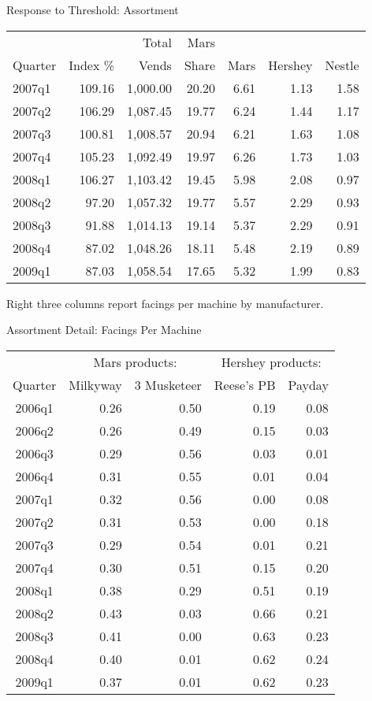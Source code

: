 \begin{frame}{Response to Threshold: Assortment}
\small
\begin{center}
\begin{tabular}{|l | rrr | rrr|} \toprule
 & & Total & Mars  & &  &  \\ 
Quarter &   Index \% & Vends & Share & Mars & Hershey & Nestle \\ \midrule
2007q1 & 109.16 & 1,000.00 & 20.20 & 6.61 & 1.13 & 1.58 \\
2007q2 & 106.29 & 1,087.45 & 19.77 & 6.24 & 1.44 & 1.17 \\
2007q3 & 100.81 & 1,008.57 & 20.94 & 6.21 & 1.63 & 1.08 \\
2007q4 & 105.23 & 1,092.49 & 19.97 & 6.26 & 1.73 & 1.03 \\ \midrule
2008q1 & 106.27 & 1,103.42 & 19.45 & 5.98 & 2.08 & 0.97 \\   \midrule
2008q2 & 97.20 & 1,057.32 & 19.77 & 5.57 & 2.29 & 0.93 \\ 
2008q3 & 91.88 & 1,014.13 & 19.14 & 5.37 & 2.29 & 0.91 \\
2008q4 & 87.02 & 1,048.26 & 18.11 & 5.48 & 2.19 & 0.89 \\
2009q1 & 87.03 & 1,058.54 & 17.65 & 5.32 & 1.99 & 0.83 \\ 
\bottomrule
\end{tabular}
\end{center}

Right three columns report facings per machine by manufacturer.
\end{frame}

\begin{frame}{Assortment Detail: Facings Per Machine}
\footnotesize
\begin{center}
\begin{tabular}{|c | r r r r|}\midrule
&\multicolumn{2}{c}{Mars products:}&\multicolumn{2}{c|}{Hershey products:}\\
Quarter &  Milkyway &  3 Musketeer & Reese's PB & Payday \\
\toprule
2006q1 & 0.26 & 0.50 & 0.19 & 0.08 \\
2006q2 & 0.26 & 0.49 & 0.15 & 0.03 \\
2006q3 & 0.29 & 0.56 & 0.03 & 0.01 \\
2006q4 & 0.31 & 0.55 & 0.01 & 0.04 \\
2007q1 & 0.32 & 0.56 & 0.00 & 0.08 \\
2007q2 & 0.31 & 0.53 & 0.00 & 0.18 \\
2007q3 & 0.29 & 0.54 & 0.01 & 0.21 \\
2007q4 & 0.30 & 0.51 & 0.15 & 0.20 \\ \midrule
2008q1 & 0.38 & 0.29 & 0.51 & 0.19 \\  \midrule
2008q2 & 0.43 & 0.03 & 0.66 & 0.21 \\ 
2008q3 & 0.41 & 0.00 & 0.63 & 0.23 \\
2008q4 & 0.40 & 0.01 & 0.62 & 0.24 \\
2009q1 & 0.37 & 0.01 & 0.62 & 0.23 \\ \bottomrule
\end{tabular}
\end{center}
\end{frame}


